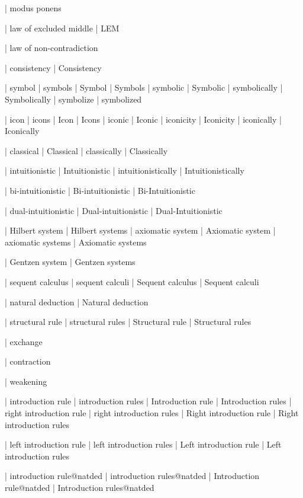  | modus ponens

 | law of excluded middle
 | LEM

 | law of non-contradiction

 | consistency
 | Consistency

 | symbol
 | symbols
 | Symbol
 | Symbols
 | symbolic
 | Symbolic
 | symbolically
 | Symbolically
 | symbolize
 | symbolized

 | icon
 | icons
 | Icon
 | Icons
 | iconic
 | Iconic
 | iconicity
 | Iconicity
 | iconically
 | Iconically
 
 | classical
 | Classical
 | classically
 | Classically

 | intuitionistic
 | Intuitionistic
 | intuitionistically
 | Intuitionistically

 | bi-intuitionistic
 | Bi-intuitionistic
 | Bi-Intuitionistic

 | dual-intuitionistic
 | Dual-intuitionistic
 | Dual-Intuitionistic

 | Hilbert system
 | Hilbert systems
 | axiomatic system
 | Axiomatic system
 | axiomatic systems
 | Axiomatic systems

 | Gentzen system
 | Gentzen systems

 | sequent calculus
 | sequent calculi
 | Sequent calculus
 | Sequent calculi

 | natural deduction
 | Natural deduction

 | structural rule
 | structural rules
 | Structural rule
 | Structural rules

 | exchange

 | contraction

 | weakening

 | introduction rule
 | introduction rules
 | Introduction rule
 | Introduction rules
 | right introduction rule
 | right introduction rules
 | Right introduction rule
 | Right introduction rules

 | left introduction rule
 | left introduction rules
 | Left introduction rule
 | Left introduction rules

 | introduction rule@natded
 | introduction rules@natded
 | Introduction rule@natded
 | Introduction rules@natded

